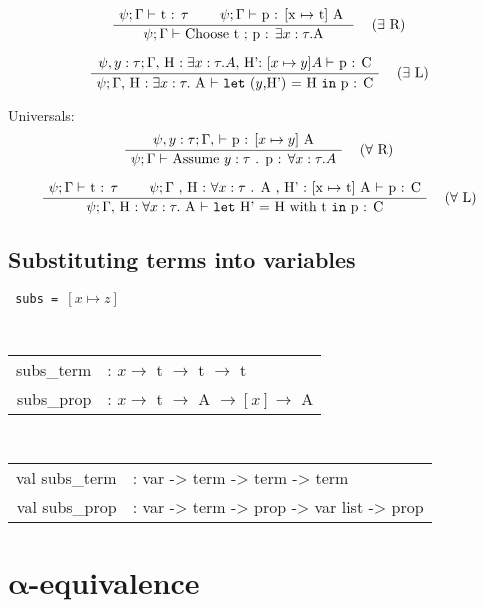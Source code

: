 \documentclass[twoside,a4paper]{article}
\theoremstyle{definition}
\begin{document}
\[
\AxiomC{$\psi ; \Gamma \vdash$ t : $\tau$}
\AxiomC{$\psi ; \Gamma \vdash$ p : [x $\mapsto$ t] A }
\RightLabel{\quad ($\exists$ R)}
\BinaryInfC{$\psi ; \Gamma \vdash$ Choose t ; p : $\exists x : \tau . $A}
\DisplayProof
\]

\[
\AxiomC{$\psi, y:\tau ; \Gamma, $ H $:\exists x : \tau . A, $ H': $[x \mapsto y] A \vdash$ p : C}
\RightLabel{\quad ($\exists$ L)}
\UnaryInfC{$\psi ; \Gamma , $ H $:\exists x:\tau. $ A $ \vdash$
{\tt let} ($y$,H') = H {\tt in} p : C}
\DisplayProof
\]

Universals:
\[
\AxiomC{$\psi , y : \tau  ; \Gamma , $ $\vdash$ p : [$x \mapsto y$] A}
\RightLabel{\quad ($\forall$ R)}
\UnaryInfC{$\psi ; \Gamma \vdash$ Assume $y:\tau$ . p : $\forall x : \tau . A $}
\DisplayProof
\]

\[
\AxiomC{$\psi ; \Gamma \vdash$ t : $\tau$}
\AxiomC{$\psi ; \Gamma$ ,
H : $\forall x : \tau $ . A ,
H' : [x $\mapsto$ t] A  $\vdash$ p : C}
\RightLabel{\quad ($\forall$ L)}
\BinaryInfC{$\psi ; \Gamma , $ H $:\forall x:\tau. $ A $ \vdash$
{\tt let} H' = H with t {\tt in} p : C}
\DisplayProof
\]

\subsection{Substituting terms into variables}

\begin{center}
{\tt
subs = $[x \mapsto z]$
}
\end{center}

\begin{center}
{\tt
\begin{tabular}{rl}
subs_term &: $x \rightarrow $ t $ \rightarrow $ t $\rightarrow$ t
\\
subs_prop &: $x\rightarrow$ t $\rightarrow$ A $\rightarrow[x]\rightarrow$ A
\end{tabular}
}
\end{center}

\begin{center}
{\tt
\begin{tabular}{rl}
val subs_term &: var -> term -> term -> term
\\
val subs_prop &: var -> term -> prop -> var list -> prop
\end{tabular}
}
\end{center}

\section{$\boldsymbol \alpha$-equivalence}
\end{document}
